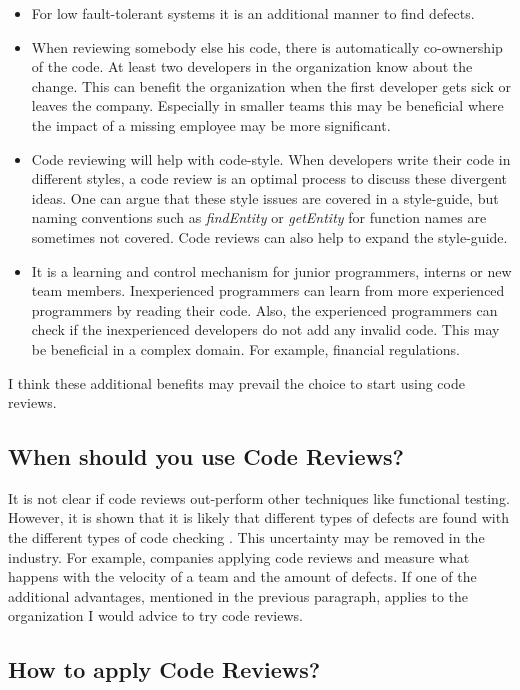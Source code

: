 \begin{itemize}
\setlength\itemsep{0em}
\item
For low fault-tolerant systems it is an additional manner to find defects.
\item
When reviewing somebody else his code, there is automatically co-ownership of the code.
At least two developers in the organization know about the change.
This can benefit the organization when the first developer gets sick or leaves the company.
Especially in smaller teams this may be beneficial where the impact of a missing employee may be more significant.
\item
Code reviewing will help with code-style. When developers write their code in different styles, a code review is an optimal process to discuss these divergent ideas.
One can argue that these style issues are covered in a style-guide, but naming conventions such as \textit{findEntity} or \textit{getEntity} for function names are sometimes not covered.
Code reviews can also help to expand the style-guide.
\item
It is a learning and control mechanism for junior programmers, interns or new team members.
Inexperienced programmers can learn from more experienced programmers by reading their code.
Also, the experienced programmers can check if the inexperienced developers do not add any invalid code.
This may be beneficial in a complex domain. For example, financial regulations.
\end{itemize}

I think these additional benefits may prevail the choice to start using code reviews.

\subsection*{When should you use Code Reviews?}

It is not clear if code reviews out-perform other techniques like functional testing.
However, it is shown that it is likely that different types of defects are found with the different types of code checking \autocite{Juristo2003}.
This uncertainty may be removed in the industry. For example, companies applying code reviews and measure what happens with the velocity of a team and the amount of defects.
If one of the additional advantages, mentioned in the previous paragraph, applies to the organization I would advice to try code reviews.

\subsection*{How to apply Code Reviews?}

